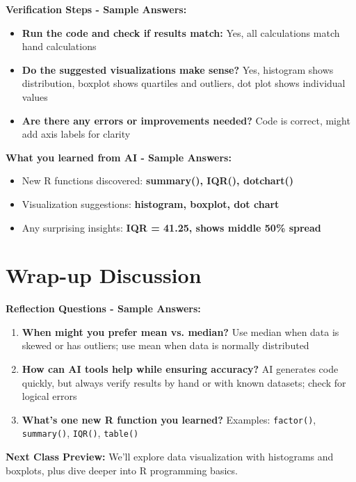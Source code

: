 \documentclass[11pt]{article}
\begin{document}
\textbf{Verification Steps - Sample Answers:}
\begin{itemize}
\item \textcolor{answergreen}{\textbf{Run the code and check if results match:}} Yes, all calculations match hand calculations
\item \textcolor{answergreen}{\textbf{Do the suggested visualizations make sense?}} Yes, histogram shows distribution, boxplot shows quartiles and outliers, dot plot shows individual values
\item \textcolor{answergreen}{\textbf{Are there any errors or improvements needed?}} Code is correct, might add axis labels for clarity
\end{itemize}

\textbf{What you learned from AI - Sample Answers:}
\begin{itemize}
\item New R functions discovered: \textcolor{answergreen}{\textbf{summary(), IQR(), dotchart()}}
\item Visualization suggestions: \textcolor{answergreen}{\textbf{histogram, boxplot, dot chart}}
\item Any surprising insights: \textcolor{answergreen}{\textbf{IQR = 41.25, shows middle 50\% spread}}
\end{itemize}

\section{Wrap-up Discussion}

\textbf{Reflection Questions - Sample Answers:}
\begin{enumerate}
\item \textcolor{answergreen}{\textbf{When might you prefer mean vs. median?}} Use median when data is skewed or has outliers; use mean when data is normally distributed
\item \textcolor{answergreen}{\textbf{How can AI tools help while ensuring accuracy?}} AI generates code quickly, but always verify results by hand or with known datasets; check for logical errors
\item \textcolor{answergreen}{\textbf{What's one new R function you learned?}} Examples: \texttt{factor()}, \texttt{summary()}, \texttt{IQR()}, \texttt{table()}
\end{enumerate}

\textbf{Next Class Preview:}
We'll explore data visualization with histograms and boxplots, plus dive deeper into R programming basics.
\end{document}
